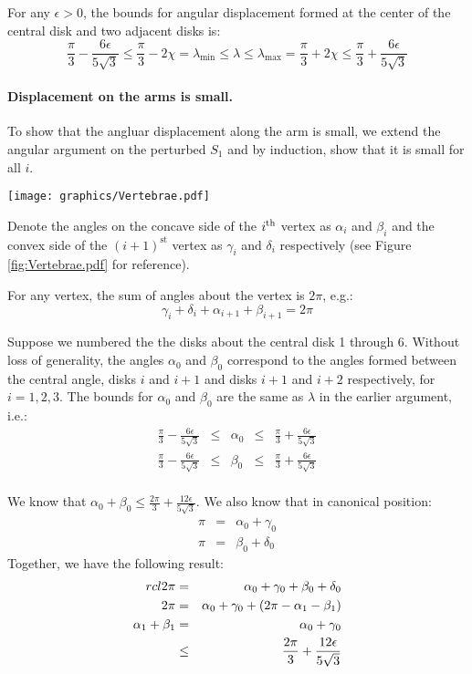 For any $\epsilon > 0$, the bounds for angular displacement formed at the center of the central disk and two adjacent disks is:
$$ \frac{\pi}{3} - \frac{6 \epsilon}{5\sqrt{3}} \leq \frac{\pi}{3} - 2 \chi = \lambda_\text{min} \leq \lambda \leq \lambda_\text{max} = \frac{\pi}{3} + 2 \chi \leq \frac{\pi}{3} + \frac{6 \epsilon}{5\sqrt{3}}$$
\paragraph{Displacement on the arms is small.}
To show that the angluar displacement along the arm is small, we extend the angular argument on the perturbed $S_1$ and by induction, show that it is small for all $i$.  

\begin{minipage}{\linewidth}
\begin{center}
\texttt{[image: graphics/Vertebrae.pdf]}
\label{fig:Vertebrae.pdf}
\end{center}
\end{minipage}

Denote the angles on the concave side of the $i^\text{th}$ vertex as $\alpha_i$ and $\beta_i$ and the convex side of the $(i+1)^\text{st}$ vertex as $\gamma_i$ and $\delta_i$ respectively (see Figure \ref{fig:Vertebrae.pdf} for reference). 

For any vertex, the sum of angles about the vertex is $2 \pi$, e.g.:
$$\gamma_i + \delta_i + \alpha_{i+1} + \beta_{i+1} = 2 \pi$$ 

Suppose we numbered the the disks about the central disk 1 through 6.  
Without loss of generality, the angles $\alpha_0$ and $\beta_0$ correspond to the angles formed between the central angle, disks $i$ and $i+1$ and disks $i+1$ and $i+2$ respectively, for $i = 1,2,3$.  
The bounds for $\alpha_0$ and $\beta_0$ are the same as $\lambda$ in the earlier argument, i.e.:
$$
\begin{array}{rcccl}
\frac{\pi}{3} - \frac{6 \epsilon}{5\sqrt{3}} &\leq& \alpha_0 &\leq& \frac{\pi}{3} + \frac{6 \epsilon}{5\sqrt{3}}\\
\frac{\pi}{3} - \frac{6 \epsilon}{5\sqrt{3}} &\leq& \beta_0 &\leq& \frac{\pi}{3} + \frac{6 \epsilon}{5\sqrt{3}}\\
\end{array}
$$

We know that $\alpha_0 + \beta_0 \leq \frac{2\pi}{3} + \frac{12\epsilon}{5\sqrt{3}}.$
We also know that in canonical position:
$$ 
\begin{array}{rcl}
\pi &=& \alpha_0 + \gamma_0 \\
\pi &=& \beta_0 + \delta_0
\end{array}
$$
Together, we have the following result:
\begin{eqnarray*}{rcl}
2\pi &=& \alpha_0 + \gamma_0 + \beta_0 + \delta_0\\
2\pi &=& \alpha_0 + \gamma_0 + \left( 2\pi - \alpha_1 - \beta_1 \right)\\
\alpha_1 + \beta_1&=&\alpha_0 + \gamma_0 \\
&\leq& \frac{2\pi}{3} + \frac{12\epsilon}{5\sqrt{3}}\\
\end{eqnarray*}
